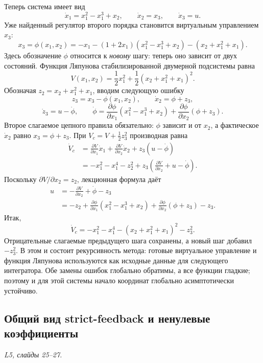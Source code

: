 Теперь система имеет вид
\[
  \dot x_1=x_1^2-x_1^3+x_2,\qquad
  \dot x_2=x_3,\qquad \dot x_3=u.
\]
Уже найденный регулятор второго порядка становится виртуальным
управлением $x_3$:
\[
  x_3=\phi(x_1,x_2)
  =-x_1-(1+2x_1)(x_1^2-x_1^3+x_2)-(x_2+x_1^2+x_1).
\]
Здесь обозначение $\phi$ относится к \emph{новому} шагу: теперь оно
зависит от двух состояний. Функция Ляпунова стабилизированной
двумерной подсистемы равна
\[
  V(x_1,x_2)=\frac12x_1^2+\frac12(x_2+x_1^2+x_1)^2.
\]
Обозначая $z_2=x_2+x_1^2+x_1$, вводим следующую ошибку
\[
  z_3=x_3-\phi(x_1,x_2),\qquad
  \dot x_2=\phi+z_3,
\]
\[
  \dot z_3=u-\dot\phi,
  \qquad
  \dot\phi=
  \frac{\partial\phi}{\partial x_1}(x_1^2-x_1^3+x_2)
  +\frac{\partial\phi}{\partial x_2}(\phi+z_3).
\]
Второе слагаемое цепного правила обязательно: $\phi$ зависит и от
$x_2$, а фактическое $\dot x_2$ равно $x_3=\phi+z_3$.
При $V_c=V+\tfrac12z_3^2$ производная равна
\begin{align*}
  \dot V_c
  &=\frac{\partial V}{\partial x_1}\dot x_1
    +\frac{\partial V}{\partial x_2}\dot x_2
    +z_3(u-\dot\phi)\\
  &=-x_1^2-x_1^4-z_2^2
    +z_3\left(\frac{\partial V}{\partial x_2}+u-\dot\phi\right).
\end{align*}
Поскольку $\partial V/\partial x_2=z_2$, лекционная формула даёт
\begin{align*}
  u&=-\frac{\partial V}{\partial x_2}+\dot\phi-z_3\\
   &=-z_2+
     \frac{\partial\phi}{\partial x_1}(x_1^2-x_1^3+x_2)
     +\frac{\partial\phi}{\partial x_2}(\phi+z_3)-z_3.
\end{align*}
Итак,
\[
  \dot V_c=-x_1^2-x_1^4-(x_2+x_1^2+x_1)^2-z_3^2.
\]
Отрицательные слагаемые предыдущего шага сохранены, а новый шаг
добавил $-z_3^2$. В этом и состоит рекурсивность метода: готовые
виртуальное управление и функция Ляпунова используются как исходные
данные для следующего интегратора.
Обе замены ошибок глобально обратимы, а все функции гладкие;
поэтому и для этой системы начало координат глобально
асимптотически устойчиво.

\newpage
\subsection{Общий вид strict-feedback и ненулевые коэффициенты}
\textit{L5, слайды 25--27.}

